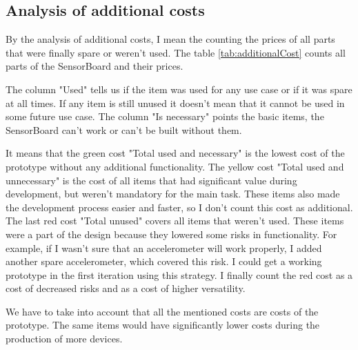 \subsection{Analysis of additional costs}
\label{HWadditionalCosts}
By the analysis of additional costs, I mean the counting the prices of all parts that were finally spare or weren't used. The table \ref{tab:additionalCost} counts all parts of the SensorBoard and their prices.

The column "Used" tells us if the item was used for any use case or if it was spare at all times. If any item is still unused it doesn't mean that it cannot be used in some future use case. The column "Is necessary" points the basic items, the SensorBoard can't work or can't be built without them.

It means that the green cost "Total used and necessary" is the lowest cost of the prototype without any additional functionality. The yellow cost "Total used and unnecessary" is the cost of all items that had significant value during development, but weren't mandatory for the main task. These items also made the development process easier and faster, so I don't count this cost as additional. The last red cost "Total unused" covers all items that weren't used. These items were a part of the design because they lowered some risks in functionality. For example, if I wasn't sure that an accelerometer will work properly, I added another spare accelerometer, which covered this risk. I could get a working prototype in the first iteration using this strategy. I finally count the red cost as a cost of decreased risks and as a cost of higher versatility.

We have to take into account that all the mentioned costs are costs of the prototype. The same items would have significantly lower costs during the production of more devices.

